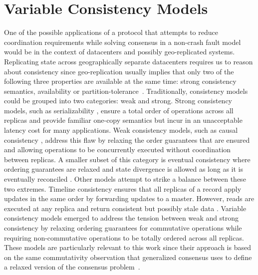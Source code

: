 \section{Variable Consistency Models} \label{Variable Consistency}

One of the possible applications of a protocol that attempts to reduce coordination requirements while solving consensus in a non-crash fault model would be in the context of datacenters and possibly geo-replicated systems. Replicating state across geographically separate datacenters requires us to reason about consistency since geo-replication usually implies that only two of the following three properties are available at the same time: strong consistency semantics, availability or partition-tolerance~\cite{Gilbert2002}. Traditionally, consistency models could be grouped into two categories: weak and strong. Strong consistency models, such as serializability \cite{Herlihy1990}, ensure a total order of operations across all replicas and provide familiar one-copy semantics but incur in an unacceptable latency cost for many applications. Weak consistency models, such as causal consistency \cite{Ahamad1995}, address this flaw by relaxing the order guarantees that are ensured and allowing operations to be concurrently executed without coordination between replicas. A smaller subset of this category is eventual consistency where ordering guarantees are relaxed and state divergence is allowed as long as it is eventually reconciled \cite{Saito2005}. Other models attempt to strike a balance between these two extremes. Timeline consistency ensures that all replicas of a record apply updates in the same order by forwarding updates to a master. However, reads are executed at any replica and return consistent but possibly stale data \cite{Silberstein2008}. Variable consistency models emerged to address the tension between weak and strong consistency by relaxing ordering guarantees for commutative operations while requiring non-commutative operations to be totally ordered across all replicas. These models are particularly relevant to this work since their approach is based on the same commutativity observation that generalized consensus uses to define a relaxed version of the consensus problem~\cite{Lamport2005}.\par
